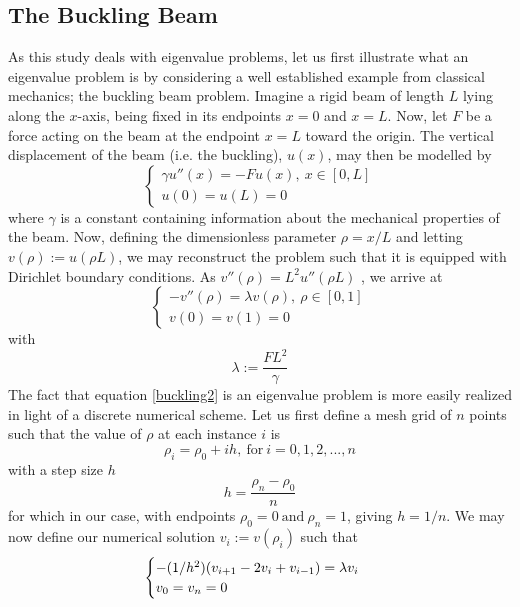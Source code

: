 	\subsection{The Buckling Beam}
	As this study deals with eigenvalue problems, let us first illustrate what an eigenvalue problem is by considering a well established example from classical mechanics; the buckling beam problem. Imagine a rigid beam of length $L$ lying along the $x$-axis, being fixed in its endpoints $x = 0$ and $x = L$. Now, let $F$ be a force acting on the beam at the endpoint $x = L$ toward the origin. The vertical displacement of the beam (i.e. the buckling), $u(x)$, may then be modelled by %
	\begin{equation}
		\begin{cases}
		\gamma u''(x) = -Fu(x),\ x \in [0,L]\\
		u(0) = u(L) = 0
		\end{cases} 
		\label{buckling}
	\end{equation}
	where $\gamma$ is a constant containing information about the mechanical properties of the beam. Now, defining the dimensionless parameter $\rho = x/L$ and letting $v(\rho) := u(\rho L)$, we may reconstruct the problem such that it is equipped with Dirichlet boundary conditions. As 
	$
	\displaystyle
	v''(\rho) = L^2u''(\rho L)
	$
	, we arrive at
	\begin{equation}
		\begin{cases}
		-v''(\rho) = \lambda v(\rho), \ \rho \in [0,1]\\
		v(0) = v(1) = 0
		\label{buckling2}
		\end{cases}
	\end{equation}
	with 
	$$
	\lambda := \frac{FL^2}{\gamma}
	$$
	The fact that equation \eqref{buckling2} is an eigenvalue problem is more easily realized in light of a discrete numerical scheme. Let us first define a mesh grid of $n$ points such that the value of $\rho$ at each instance $i$ is
	$$\rho_i = \rho_0 + ih,\ \text{for} \ i = 0,1,2,...,n$$
	with a step size $h$
	$$
	h = \frac{\rho_n - \rho_0}{n}
	$$
	for which in our case, with endpoints $\rho_0 = 0\ \text{and}\ \rho_n = 1$, giving $h = 1/n$. We may now define our numerical solution $v_i := v(\rho_i)$ such that 
	\begin{equation}
	\centering
		\begin{cases}
		-(1/h^2)(v_{i+1} - 2v_i +v_{i-1}) = \lambda v_i\\
		v_0 = v_n = 0
		\end{cases}
		\label{numerical_eigen}
	\end{equation}
